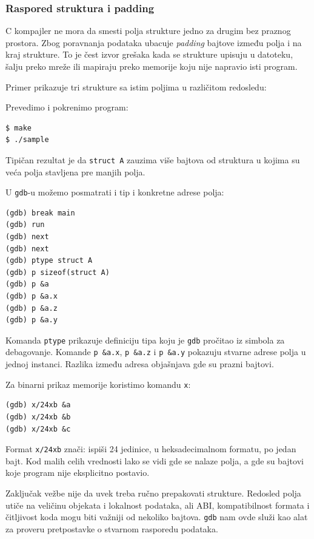 \subsubsection{Raspored struktura i padding}\label{gdb-padding}

C kompajler ne mora da smesti polja strukture jedno za drugim bez praznog prostora. Zbog poravnanja podataka ubacuje \emph{padding} bajtove između polja i na kraj strukture. To je čest izvor grešaka kada se strukture upisuju u datoteku, šalju preko mreže ili mapiraju preko memorije koju nije napravio isti program.

Primer prikazuje tri strukture sa istim poljima u različitom redosledu:


Prevedimo i pokrenimo program:

\begin{verbatim}
$ make
$ ./sample
\end{verbatim}

Tipičan rezultat je da \texttt{struct A} zauzima više bajtova od struktura u kojima su veća polja stavljena pre manjih polja.

U \texttt{gdb}-u možemo posmatrati i tip i konkretne adrese polja:

\begin{verbatim}
(gdb) break main
(gdb) run
(gdb) next
(gdb) next
(gdb) ptype struct A
(gdb) p sizeof(struct A)
(gdb) p &a
(gdb) p &a.x
(gdb) p &a.z
(gdb) p &a.y
\end{verbatim}

Komanda \texttt{ptype} prikazuje definiciju tipa koju je \texttt{gdb} pročitao iz simbola za debagovanje. Komande \texttt{p \&a.x}, \texttt{p \&a.z} i \texttt{p \&a.y} pokazuju stvarne adrese polja u jednoj instanci. Razlika između adresa objašnjava gde su prazni bajtovi.

Za binarni prikaz memorije koristimo komandu \texttt{x}:

\begin{verbatim}
(gdb) x/24xb &a
(gdb) x/24xb &b
(gdb) x/24xb &c
\end{verbatim}

Format \texttt{x/24xb} znači: ispiši 24 jedinice, u heksadecimalnom formatu, po jedan bajt. Kod malih celih vrednosti lako se vidi gde se nalaze polja, a gde su bajtovi koje program nije eksplicitno postavio.

Zaključak vežbe nije da uvek treba ručno prepakovati strukture. Redosled polja utiče na veličinu objekata i lokalnost podataka, ali ABI, kompatibilnost formata i čitljivost koda mogu biti važniji od nekoliko bajtova. \texttt{gdb} nam ovde služi kao alat za proveru pretpostavke o stvarnom rasporedu podataka.
